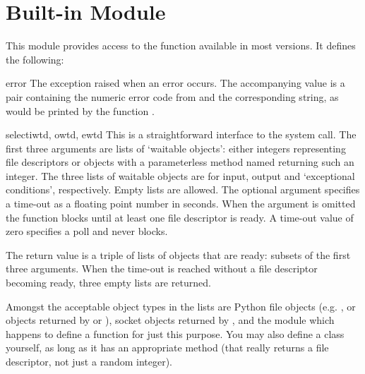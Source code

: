 \section{Built-in Module }



This module provides access to the function 
available in most \UNIX{} versions.  It defines the following:

\begin{excdesc}{error}
The exception raised when an error occurs.  The accompanying value is
a pair containing the numeric error code from  and the
corresponding string, as would be printed by the \C{} function
.
\end{excdesc}

\begin{funcdesc}{select}{iwtd, owtd, ewtd}
This is a straightforward interface to the \UNIX{} 
system call.  The first three arguments are lists of `waitable
objects': either integers representing \UNIX{} file descriptors or
objects with a parameterless method named  returning
such an integer.  The three lists of waitable objects are for input,
output and `exceptional conditions', respectively.  Empty lists are
allowed.  The optional  argument specifies a time-out as a
floating point number in seconds.  When the  argument
is omitted the function blocks until at least one file descriptor is
ready.  A time-out value of zero specifies a poll and never blocks.

The return value is a triple of lists of objects that are ready:
subsets of the first three arguments.  When the time-out is reached
without a file descriptor becoming ready, three empty lists are
returned.

Amongst the acceptable object types in the lists are Python file
objects (e.g. , or objects returned by
 or ), socket objects
returned by ,%
and the module  which happens to
define a function %
for just this purpose.  You may
also define a  class yourself, as long as it has an
appropriate  method (that really returns a \UNIX{}
file descriptor, not just a random integer).
\end{funcdesc}
